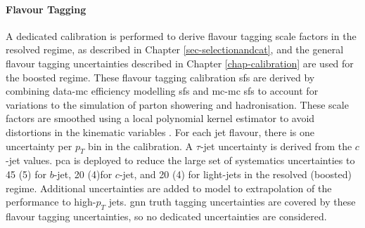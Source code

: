 \paragraph{Flavour Tagging} A dedicated calibration is performed to derive flavour tagging scale factors in the resolved regime, as described in Chapter \ref{sec-selectionandcat}, and the general flavour tagging uncertainties described in Chapter \ref{chap-calibration} are used for the boosted regime. These flavour tagging calibration \glspl{sf} are derived by combining data-\gls{mc} efficiency modelling \glspl{sf} and \gls{mc}-\gls{mc} \glspl{sf} to account for variations to the simulation of parton showering and hadronisation. These scale factors are smoothed using a local polynomial kernel estimator to avoid distortions in the kinematic variables \cite{ATL-PHYS-PUB-2020-004}. For each jet flavour, there is one uncertainty per $p_T$ bin in the calibration. A $\tau$-jet uncertainty is derived from the $c$-jet values. \gls{pca} is deployed to reduce the large set of systematics uncertainties to 45 (5) for $b$-jet, 20 (4)for $c$-jet, and 20 (4) for light-jets in the resolved (boosted) regime. Additional uncertainties are added to model to extrapolation of the performance to high-$p_T$ jets. \gls{gnn} truth tagging uncertainties are covered by these flavour tagging uncertainties, so no dedicated uncertainties are considered.

